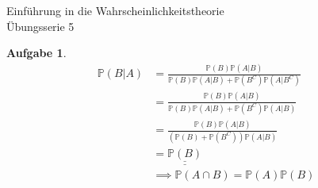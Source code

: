 \documentclass[11pt]{article}
\theoremstyle{break}
\newtheorem{task}{Aufgabe}
\begin{document}
\begin{center}
\Large{Einführung in die Wahrscheinlichkeitstheorie}\\
\large{Übungsserie 5}
\end{center}
\begin{task}
    \hfill\vspace{-5mm}
    \begin{align*}
        \mathbb{P}(B\vert A) &= \frac{\mathbb{P}(B)\mathbb{P}(A\vert B)}{\mathbb{P}(B)\mathbb{P}(A\vert B) + \mathbb{P}(B^C)\mathbb{P}(A\vert B^C)}\\
        &= \frac{\mathbb{P}(B)\mathbb{P}(A\vert B)}{\mathbb{P}(B)\mathbb{P}(A\vert B) + \mathbb{P}(B^C)\mathbb{P}(A\vert B)}\\
        &= \frac{\mathbb{P}(B)\mathbb{P}(A\vert B)}{(\mathbb{P}(B) + \mathbb{P}(B^C))\mathbb{P}(A\vert B)}\\
        &= \underline{\underline{\mathbb{P}(B)}}\\
        &\implies \mathbb{P}(A\cap B) = \mathbb{P}(A)\mathbb{P}(B)
    \end{align*}
    
\end{task}
\setcounter{task}{2}
\end{document}

